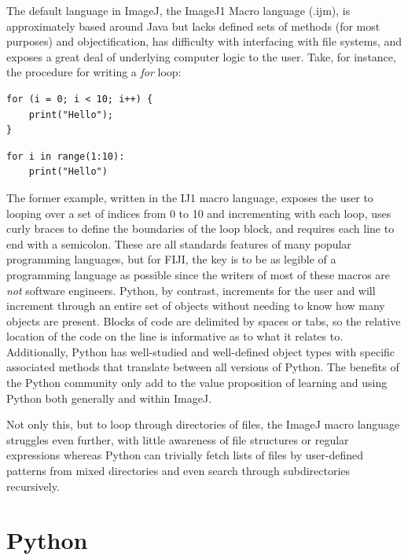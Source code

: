The default language in ImageJ, the ImageJ1 Macro language (.ijm), is approximately based around Java but lacks defined sets of methods (for most purposes) and objectification, has difficulty with interfacing with file systems, and exposes a great deal of underlying computer logic to the user. Take, for instance, the procedure for writing a \textit{for} loop:

\begin{code}
\begin{verbatim}
for (i = 0; i < 10; i++) {
    print("Hello");
}
\end{verbatim}
\end{code}

\begin{code}
\begin{verbatim}
for i in range(1:10):
    print("Hello")
\end{verbatim}
\end{code}

The former example, written in the IJ1 macro language, exposes the user to looping over a set of indices from 0 to 10 and incrementing with each loop, uses curly braces to define the boundaries of the loop block, and requires each line to end with a semicolon. These are all standards features of many popular programming languages, but for FIJI, the key is to be as legible of a programming language as possible since the writers of most of these macros are \textit{not} software engineers. Python, by contrast, increments for the user and will increment through an entire set of objects without needing to know how many objects are present. Blocks of code are delimited by spaces or tabs, so the relative location of the code on the line is informative as to what it relates to. Additionally, Python has well\hyp{}studied and well\hyp{}defined object types with specific associated methods that translate between all versions of Python. The benefits of the Python community only add to the value proposition of learning and using Python both generally and within ImageJ.

Not only this, but to loop through directories of files, the ImageJ macro language struggles even further, with little awareness of file structures or regular expressions whereas Python can trivially fetch lists of files by user\hyp{}defined patterns from mixed directories and even search through subdirectories recursively.
 
\section{Python}\label{python}

